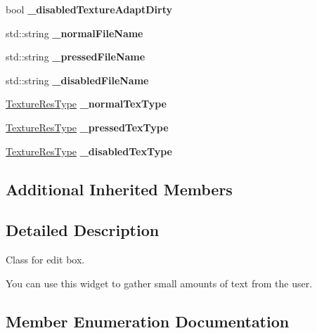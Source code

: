 \begin{DoxyCompactItemize}
bool {\bfseries \+\_\+disabled\+Texture\+Adapt\+Dirty}
\item 
\mbox{\label{classui_1_1EditBox_ab39910a89d727e625907d67771488f74}} 
std\+::string {\bfseries \+\_\+normal\+File\+Name}
\item 
\mbox{\label{classui_1_1EditBox_a86a68c84ffc50ca81dea5c92b225d03f}} 
std\+::string {\bfseries \+\_\+pressed\+File\+Name}
\item 
\mbox{\label{classui_1_1EditBox_ac97062b16b9eb2327c0e50ca408384a1}} 
std\+::string {\bfseries \+\_\+disabled\+File\+Name}
\item 
\mbox{\label{classui_1_1EditBox_a64f75155b0e32dbf0e85b2fef4830249}} 
\hyperlink{classui_1_1Widget_a040a65ec5ad3b11119b7e16b98bd9af0}{Texture\+Res\+Type} {\bfseries \+\_\+normal\+Tex\+Type}
\item 
\mbox{\label{classui_1_1EditBox_a6a025ef072a6b64e7ad88bc50678ca1c}} 
\hyperlink{classui_1_1Widget_a040a65ec5ad3b11119b7e16b98bd9af0}{Texture\+Res\+Type} {\bfseries \+\_\+pressed\+Tex\+Type}
\item 
\mbox{\label{classui_1_1EditBox_a47fb4b2d98346a2552c5f03eb4e803ab}} 
\hyperlink{classui_1_1Widget_a040a65ec5ad3b11119b7e16b98bd9af0}{Texture\+Res\+Type} {\bfseries \+\_\+disabled\+Tex\+Type}
\end{DoxyCompactItemize}
\subsection*{Additional Inherited Members}


\subsection{Detailed Description}
Class for edit box. 

You can use this widget to gather small amounts of text from the user. 

\subsection{Member Enumeration Documentation}
\mbox{\label{classui_1_1EditBox_af02f13ee9fba51d59bb3111e200848c8}} 
